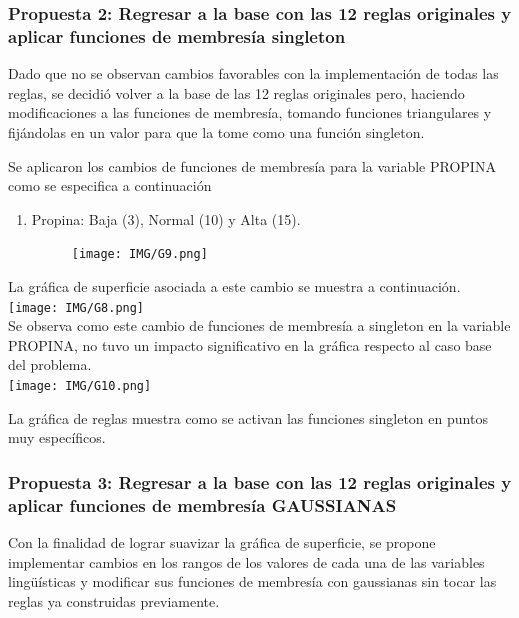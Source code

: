 \documentclass[11pt, letterpaper]{article}
\begin{document}
\newpage

\subsubsection{Propuesta 2: Regresar a la base con las 12 reglas originales y aplicar funciones de membresía singleton}

Dado que no se observan cambios favorables con la implementación de todas las reglas, se decidió volver a la base de las 12 reglas originales pero, haciendo modificaciones a las funciones de membresía, tomando funciones triangulares y fijándolas en un valor para que la tome como una función singleton.

Se aplicaron los cambios de funciones de membresía para la variable PROPINA como se especifica a continuación
 
\begin{enumerate}
	\item Propina: Baja (3), Normal (10) y Alta (15).
	\begin{figure}[h]
		\centering
		\texttt{[image: IMG/G9.png]}
	\end{figure}
\end{enumerate}


\newpage 

La gráfica de superficie asociada a este cambio se muestra a continuación. \\


\texttt{[image: IMG/G8.png]} \\

Se observa como este cambio de funciones de membresía a singleton en la variable PROPINA, no tuvo un impacto significativo en la gráfica respecto al caso base del problema. \\

\texttt{[image: IMG/G10.png]}

La gráfica de reglas muestra como se activan las funciones singleton en puntos muy específicos. \\



\newpage

\subsubsection{Propuesta 3: Regresar a la base con las 12 reglas originales y aplicar funciones de membresía GAUSSIANAS}

Con la finalidad de lograr suavizar la gráfica de superficie, se propone implementar cambios en los rangos de los valores de cada una de las variables lingüísticas y modificar sus funciones de membresía con gaussianas sin tocar las reglas ya construidas previamente.
\end{document}
